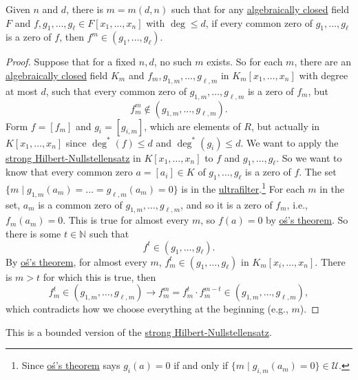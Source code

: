 \begin{theorem}
	Given \(n\) and \(d\), there is \(m=m(d, n)\) such that for any \hyperref[def:algebraically-closed]{algebraically closed} field \(F\) and \(f, g_1, \dots , g_{\ell }\in F[x_1, \dots , x_n]\) with \(\deg \leq d\), if every common zero of \(g_1, \dots , g_{\ell }\) is a zero of \(f\), then \(f^m \in (g_1, \dots , g_{\ell })\).
\end{theorem}
\begin{proof}
	Suppose that for a fixed \(n, d\), no such \(m\) exists. So for each \(m\), there are an \hyperref[def:algebraically-closed]{algebraically closed} field \(K_m\) and \(f_m, g_{1, m}, \dots , g_{\ell , m}\) in \(K_m[x_1, \dots , x_n]\) with degree at most \(d\), such that every common zero of \(g_{1, m}, \dots , g_{\ell , m}\) is a zero of \(f_m\), but
	\[
		f^m_m \notin (g_{1, m} , \dots , g_{\ell , m}).
	\]
	Form \(f = [f_m]\) and \(g_i = [g_{i, m}]\), which are elements of \(R\), but actually in \(K[x_1, \dots , x_n]\) since \(\deg^{\ast} (f) \leq d\) and \(\deg^{\ast} (g_i) \leq d\). We want to apply the \hyperref[thm:strong-Hilbert-Nullstellensatz]{strong Hilbert-Nullstellensatz} in \(K[x_1, \dots , x_n]\) to \(f\) and \(g_1, \dots , g_{\ell } \). So we want to know that every common zero \(a=[a_i] \in K\) of \(g_1, \dots , g_{\ell } \) is a zero of \(f\). The set \(\{ m \mid g_{1,m} (a_m)= \dots = g_{\ell , m} (a_m) = 0\} \) is in the \hyperref[def:ultrafilter]{ultrafilter}.\footnote{Since \hyperref[thm:Los]{oś's theorem} says \(g_i(a)= 0\) if and only if \(\{ m \mid g_{i, m}(a_m) = 0 \} \in \mathcal{U}\).} For each \(m\) in the set, \(a_m\) is a common zero of \(g_{1, m}, \dots , g_{\ell , m}\), and so it is a zero of \(f_m\), i.e., \(f_m(a_m) = 0\). This is true for almost every \(m\), so \(f(a)=0\) by \hyperref[thm:Los]{oś's theorem}. So there is some \(t\in \mathbb{N} \) such that
	\[
		f^t \in (g_1, \dots , g_{\ell } ).
	\]
	By \hyperref[thm:Los]{oś's theorem}, for almost every \(m\), \(f_m^t\in (g_1, \dots , g_{\ell } )\) in \(K_m[x_i, \dots , x_n]\). There is \(m > t\) for which this is true, then
	\[
		f_m^t\in (g_{1, m}, \dots , g_{\ell , m}) \to f_m^m = f_m^t \cdot f_m^{m-t} \in (g_{1, m}, \dots , g_{\ell , m}),
	\]
	which contradicts how we choose everything at the beginning (e.g., \(m\)).
\end{proof}

\begin{intuition}
	This is a bounded version of the \hyperref[thm:strong-Hilbert-Nullstellensatz]{strong Hilbert-Nullstellensatz}.
\end{intuition}

